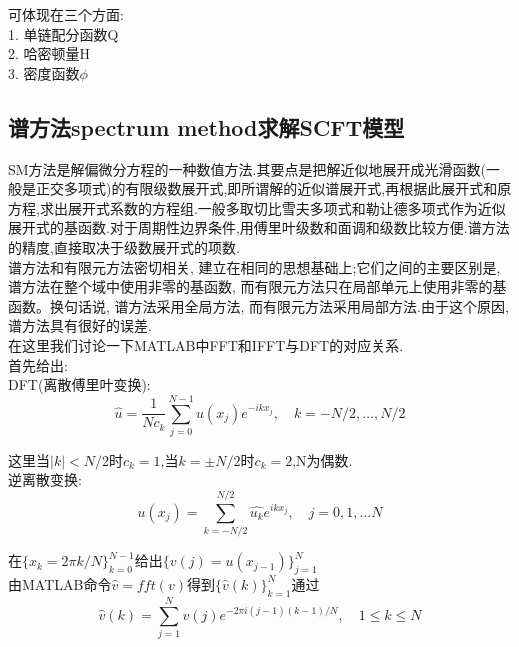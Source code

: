 \documentclass[12pt]{article}
\begin{document}
\begin{CJK}{UTF8}{gkai}
    可体现在三个方面:\\
    
    1. 单链配分函数Q\\
    
    2. 哈密顿量H\\
    
    3. 密度函数$\phi$ \\
    
    \subsection{谱方法spectrum method求解SCFT模型}
    
    \qquad SM方法是解偏微分方程的一种数值方法.其要点是把解近似地展开成光滑函数(一般是正交多项式)的有限级数展开式,即所谓解的近似谱展开式,再根据此展开式和原方程,求出展开式系数的方程组.一般多取切比雪夫多项式和勒让德多项式作为近似展开式的基函数.对于周期性边界条件,用傅里叶级数和面调和级数比较方便.谱方法的精度,直接取决于级数展开式的项数.\\
    
    谱方法和有限元方法密切相关, 建立在相同的思想基础上;它们之间的主要区别是, 谱方法在整个域中使用非零的基函数, 而有限元方法只在局部单元上使用非零的基函数。换句话说, 谱方法采用全局方法, 而有限元方法采用局部方法.由于这个原因, 谱方法具有很好的误差.\\
    
    在这里我们讨论一下MATLAB中FFT和IFFT与DFT的对应关系.\\
    
    首先给出:\\
    
    DFT(离散傅里叶变换):\\
    
   $$ \hat{u}=\dfrac{1}{Nc_{k}}\sum_{j=0}^{N-1}u(x_j)e^{-  ikx_j},\quad k=-N/2,\dots,N/2$$
   
   这里当$|k|< N/2$时$c_k=1$,当$k=\pm N/2$时$c_k=2$,N为偶数.\\
   
    逆离散变换:\\
  
  $$u(x_j)=\sum_{k=-N/2}^{N/2} \hat{u_k}e^{ikx_j},\quad j=0,1,\dots N$$
  
  在$\{x_k=2\pi k /N\}_{k=0}^{N-1}$给出$\{v(j)=u(x_{j-1})\}_{j=1}^{N}$\\
  
 由MATLAB命令$ \hat{v}=fft(v)$得到$\{\hat{v}(k)\}_{k=1}^N$通过\\
 
 $$\hat{v}(k)=\sum_{j=1}^{N}v(j)e^{-2\pi i(j-1)(k-1)/N},\quad 1\leq k \leq N$$
 

\end{CJK}
\end{document}
